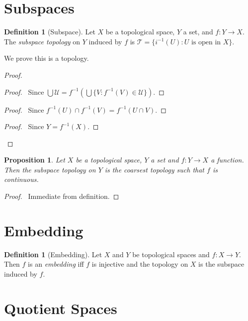 \documentclass{book}
\let\qed\relax
\newtheorem{prop}[ax]{Proposition}
\theoremstyle{definition}
\newtheorem{df}[ax]{Definition}
\newcommand{\inv}[1]{\ensuremath{{#1}^{-1}}}
\begin{document}
\section{Subspaces}

\begin{df}[Subspace]
Let $X$ be a topological space, $Y$ a set, and $f : Y \rightarrow X$. The \emph{subspace topology} on $Y$ induced by $f$ is $\mathcal{T} = \{ \inv{i}(U) : U \text{ is open in } X \}$.

We prove this is a topology.
\end{df}

\begin{proof}
\pf
{}
\begin{proof}
	\pf\ Since $\bigcup \mathcal{U} = \inv{f}(\bigcup \{ V : \inv{f}(V) \in \mathcal{U}\})$.
\end{proof}
\begin{proof}
	\pf\ Since $\inv{f}(U) \cap \inv{f}(V) = \inv{f}(U 
\cap V)$.
\end{proof}
\begin{proof}
	\pf\ Since $Y = \inv{f}(X)$.
\end{proof}
\qed
\end{proof}

\begin{prop}
Let $X$ be a topological space, $Y$ a set and $f : Y \rightarrow X$ a function. Then the subspace topology on $Y$ is the coarsest topology such that $f$ is continuous.
\end{prop}

\begin{proof}
\pf\ Immediate from definition. \qed
\end{proof}

\section{Embedding}

\begin{df}[Embedding]
Let $X$ and $Y$ be topological spaces and $f : X \rightarrow Y$. Then $f$ is an \emph{embedding} iff $f$ is injective and the topology on $X$ is the subspace induced by $f$.
\end{df}

\section{Quotient Spaces}
\end{document}
